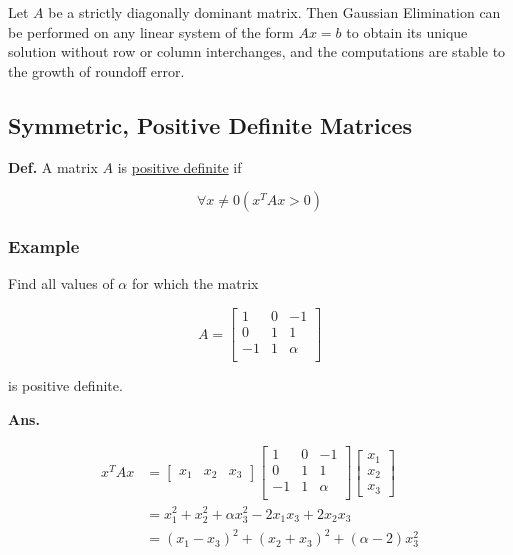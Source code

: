 \documentclass[12pt]{article}
\begin{document}
Let $A$ be a strictly diagonally dominant matrix. Then Gaussian Elimination
can be performed on any linear system of the form $Ax=b$ to obtain its 
unique solution without row or column interchanges, and the computations
are stable to the growth of roundoff error.

\subsection{Symmetric, Positive Definite Matrices}

\textbf{Def.} A matrix $A$ is \uline{positive definite} if

\begin{equation*}
  \forall x\ne 0 (x^T A x > 0)
\end{equation*}

\subsubsection*{Example}

Find all values of $\alpha$ for which the matrix

\begin{equation*}
  A = 
  \begin{bmatrix}
    1 & 0 & -1\\
    0 & 1 & 1\\
    -1 & 1 & \alpha\\
  \end{bmatrix}
\end{equation*}

is positive definite.

\textbf{Ans.} 

\begin{align*}
  x^T Ax &= 
  \begin{bmatrix}
  x_1 & x_2 & x_3
  \end{bmatrix}
  \begin{bmatrix}
    1 & 0 & -1\\
    0 & 1 & 1\\
    -1 & 1 & \alpha\\
  \end{bmatrix}
  \begin{bmatrix}
  x_1 \\ x_2 \\ x_3
  \end{bmatrix}\\
         &= x_1^2 + x_2^2 + \alpha x_3^2 - 2x_1x_3 + 2x_2x_3 \\
         &= (x_1 - x_3)^2 + (x_2 + x_3)^2 + (\alpha - 2) x_3^2 
\end{align*}
\end{document}
